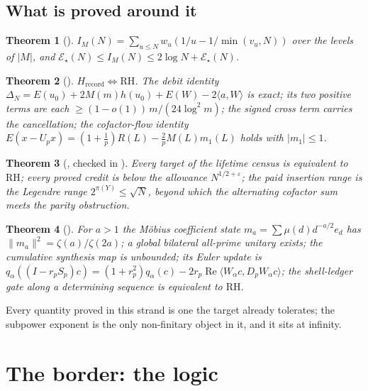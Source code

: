 \documentclass[11pt]{article}
\newtheorem{theorem}{Theorem}[section]
\theoremstyle{definition}
\theoremstyle{remark}
\newcommand{\Hrec}{H_{\mathrm{record}}}
\newcommand{\Ree}{\operatorname{Re}}
\begin{document}
\subsection{What is proved around it}
\begin{theorem}[{\cite[Part XVII]{running}}]\label{thm:lifetime}
$I_M(N)=\sum_{u\le N}w_u(1/u-1/\min(v_u,N))$ over the levels of $|M|$, and $\mathcal E_\star(N)\le I_M(N)\le2\log N+\mathcal E_\star(N)$.
\end{theorem}
\begin{theorem}[{\cite[Thm.\ 3.1, \S4, \S7]{hrec}}]\label{thm:hrec}
$\Hrec\iff\mathrm{RH}$. The debit identity $\Delta_N=E(u_0)+2M(m)h(u_0)+E(W)-2\langle a,W\rangle$ is exact; its two positive terms are each $\ge(1-o(1))\,m/(24\log^2m)$; the signed cross term carries the cancellation; the cofactor-flow identity $E(x-U_px)=(1+\tfrac1p)R(L)-\tfrac2p M(L)m_1(L)$ holds with $|m_1|\le1$.
\end{theorem}
\begin{theorem}[{\cite{census}}, checked in \cite{censusaudit}]\label{thm:census}
Every target of the lifetime census is equivalent to $\mathrm{RH}$; every proved credit is below the allowance $N^{1/2+\varepsilon}$; the paid insertion range is the Legendre range $2^{\pi(Y)}\le\sqrt N$, beyond which the alternating cofactor sum meets the parity obstruction.
\end{theorem}
\begin{theorem}[{\cite{v32}}]\label{thm:v32}
For $a>1$ the Möbius coefficient state $m_a=\sum\mu(d)d^{-a/2}e_d$ has $\|m_a\|^2=\zeta(a)/\zeta(2a)$; a global bilateral all-prime unitary exists; the cumulative synthesis map is unbounded; its Euler update is $q_\alpha((I-r_pS_p)c)=(1+r_p^2)q_\alpha(c)-2r_p\Ree\langle W_\alpha c,D_pW_\alpha c\rangle$; the shell-ledger gate along a determining sequence is equivalent to $\mathrm{RH}$.
\end{theorem}
Every quantity proved in this strand is one the target already tolerates; the subpower exponent is the only non-finitary object in it, and it sits at infinity.

\section{The border: the logic}\label{sec:border}
\end{document}
